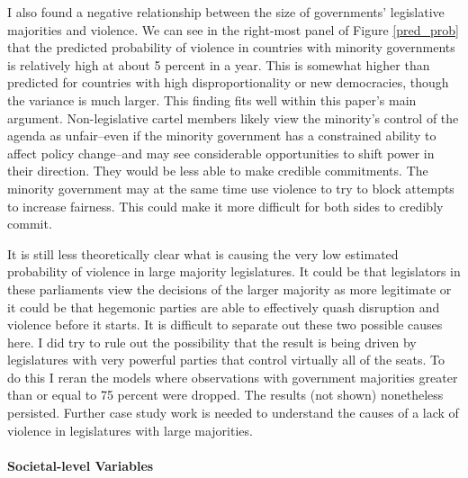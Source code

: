 \documentclass[a4paper]{article}\usepackage[]{graphicx}\usepackage[]{color}
\begin{document}
I also found a negative relationship between the size of governments' legislative majorities and violence. We can see in the right-most panel of Figure \ref{pred_prob} that the predicted probability of violence in countries with minority governments is relatively high at about 5 percent in a year. This is somewhat higher than predicted for countries with high disproportionality or new democracies, though the variance is much larger. This finding fits well within this paper's main argument. Non-legislative cartel members likely view the minority's control of the agenda as unfair--even if the minority government has a constrained ability to affect policy change--and may see considerable opportunities to shift power in their direction. They would be less able to make credible commitments. The minority government may at the same time use violence to try to block attempts to increase fairness. This could make it more difficult for both sides to credibly commit. 

It is still less theoretically clear what is causing the very low estimated probability of violence in large majority legislatures. It could be that legislators in these parliaments view the decisions of the larger majority as more legitimate or it could be that hegemonic parties are able to effectively quash disruption and violence before it starts. It is difficult to separate out these two possible causes here. I did try to rule out the possibility that the result is being driven by legislatures with very powerful parties that control virtually all of the seats. To do this I reran the models where observations with government majorities greater than or equal to 75 percent were dropped. The results (not shown) nonetheless persisted. Further case study work is needed to understand the causes of a lack of violence in legislatures with large majorities.

\paragraph{Societal-level Variables}
\end{document}
